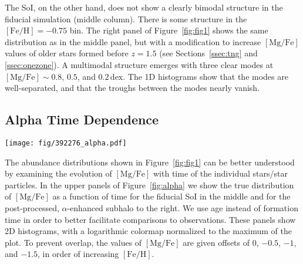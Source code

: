 \documentclass[twocolumn]{aastex631}
\newcommand{\Gyr}{\ensuremath{\textrm{Gyr}}}
\newcommand{\FeH}{\ensuremath{[\textrm{Fe}/\textrm{H}]}}
\newcommand{\MgFe}{\ensuremath{[\textrm{Mg}/\textrm{Fe}]}}
\newcommand{\dex}{\ensuremath{\textrm{dex}}}
\begin{document}
The SoI, on the other hand, does not show a clearly bimodal structure in the fiducial simulation (middle column). There is some structure in the $\FeH=-0.75$ bin. The right panel of Figure~\ref{fig:fig1} shows the same distribution as in the middle panel, but with a modification to increase \MgFe{} values of older stars formed before $z=1.5$ (see Sections~\ref{ssec:tng} and \ref{ssec:onezone}). A multimodal structure emerges with three clear modes at $\MgFe\sim0.8$, $0.5$, and $0.2\,\dex$. The 1D histograms show that the modes are well-separated, and that the troughs between the modes nearly vanish.

\subsection{Alpha Time Dependence}\label{ssec:alpha_time}

\begin{figure*}
  \centering
  \texttt{[image: fig/392276\_alpha.pdf]}
  \caption{\textbf{Bimodality in the abundance plane is linked to distinct epochs in simulation.} The upper panels show \MgFe{} as a function of age for our subhalo in TNG. The colors indicate stellar populations at fixed values of \FeH{}, which are the same as in Figure~\ref{fig:fig1}. A gap in the relation occurs at an age of approximately $10.6\,\Gyr$, which we indicate with a vertical dashed line. The effect of the $\alpha$-enhancement is clear, as it separates the stars that form before and after this gap in ages (star particles which formed before $z=1.5$ are $\alpha$-enhanced, which occurs at an age of $\sim9.5\,\Gyr$). The lower panels show on the left the Milky Way and on the center and right the data from TNG but with $12.5\%$ age errors and $0.01\,\dex$ errors in \MgFe{}. When the simulations are given these errors, we see that the before and after star particles smear such that the two populations significantly overlap in ages. In the $\alpha$-enhanced SoI, two populations emerge in each bin which overlapped in the fiducial distribution. This feature more closely resembles the Milky Way, which displays such populations where the bimodality is strongest -- $\FeH=-0.5$ (blue) and $-0.25$ (orange).}
  \label{fig:alpha}
\end{figure*}

The abundance distributions shown in Figure~\ref{fig:fig1} can be better understood by examining the evolution of \MgFe{} with time of the individual stars/star particles. In the upper panels of Figure~\ref{fig:alpha} we show the true distribution of \MgFe{} as a function of time for the fiducial SoI in the middle and for the post-processed, $\alpha$-enhanced subhalo to the right. We use age instead of formation time in order to better facilitate comparisons to observations. These panels show 2D histograms, with a logarithmic colormap normalized to the maximum of the plot. To prevent overlap, the values of \MgFe{} are given offsets of $0$, $-0.5$, $-1$, and $-1.5$, in order of increasing \FeH{}.
\end{document}
